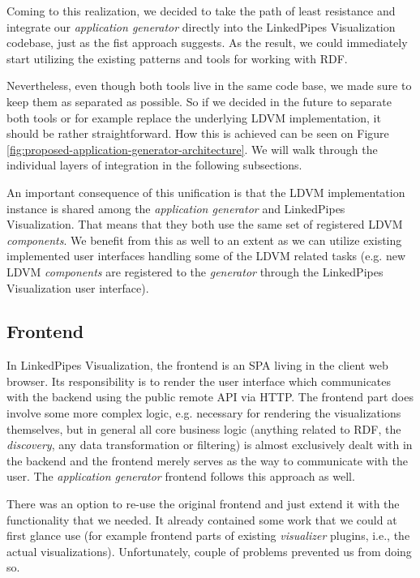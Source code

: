 Coming to this realization, we decided to take the path of least resistance and integrate our \emph{application generator} directly into the LinkedPipes Visualization codebase, just as the fist approach suggests. As the result, we could immediately start utilizing the existing patterns and tools for working with RDF. 

Nevertheless, even though both tools live in the same code base, we made sure to keep them as separated as possible. So if we decided in the future to separate both tools or for example replace the underlying LDVM implementation, it should be rather straightforward. How this is achieved can be seen on Figure \ref{fig:proposed-application-generator-architecture}. We will walk through the individual layers of integration in the following subsections.

An important consequence of this unification is that the LDVM implementation instance is shared among the \emph{application generator} and LinkedPipes Visualization. That means that they both use the same set of registered LDVM \emph{components}. We benefit from this as well to an extent as we can utilize existing implemented user interfaces handling some of the LDVM related tasks (e.g. new LDVM \emph{components} are registered to the \emph{generator} through the LinkedPipes Visualization user interface).

\subsection{Frontend}

In LinkedPipes Visualization, the frontend is an SPA living in the client web browser. Its responsibility is to render the user interface which communicates with the backend using the public remote API via HTTP. The frontend part does involve some more complex logic, e.g. necessary for rendering the visualizations themselves, but in general all core business logic (anything related to RDF, the \emph{discovery}, any data transformation or filtering) is almost exclusively dealt with in the backend and the frontend merely serves as the way to communicate with the user. The \emph{application generator} frontend follows this approach as well.

There was an option to re-use the original frontend and just extend it with the functionality that we needed. It already contained some work that we could at first glance use (for example frontend parts of existing \emph{visualizer} plugins, i.e., the actual visualizations). Unfortunately, couple of problems prevented us from doing so. 

